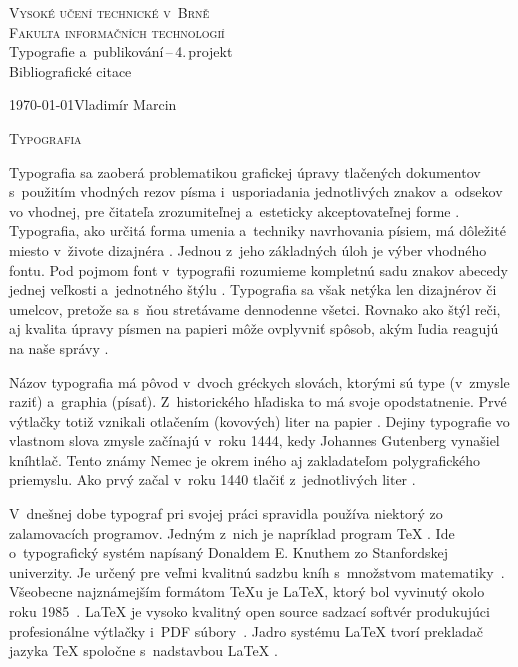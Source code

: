 \documentclass[11pt,a4paper,titlepage]{article}
\begin{document}
\begin{titlepage}
  \begin{center}
    {\Huge\textsc{Vysoké učení technické v~Brně}} \\
     \medskip
    {\huge\textsc{Fakulta informačních technologií}} \\
    {\LARGE{Typografie a~publikování\,--\,4.\,projekt}} \\
     \medskip
    {\Huge Bibliografické citace}\\
  \end{center}
{\Large\today \hfill Vladimír Marcin}
\end{titlepage}

{\Huge\textsc{Typografia}}
\medskip

Typografia sa zaoberá problematikou grafickej úpravy tlačených dokumentov s~použitím vhodných rezov písma i~usporiadania jednotlivých
znakov a~odsekov vo vhodnej, pre čitateľa zrozumiteľnej a~esteticky akceptovateľnej forme \cite{Wiki:Typografia}. Typografia, ako určitá
forma umenia a~techniky navrhovania písiem, má dôležité miesto v~živote dizajnéra \cite{Detepe:Typografia}. Jednou z~jeho základných úloh
je výber vhodného fontu. Pod pojmom font v~typografii rozumieme kompletnú sadu znakov abecedy jednej veľkosti a~jednotného štýlu \cite{Nishikimi:Fonts}.
Typografia sa však netýka len dizajnérov či umelcov, pretože sa s~ňou stretávame dennodenne všetci. Rovnako ako štýl reči, aj kvalita
úpravy písmen na papieri môže ovplyvniť spôsob, akým ľudia reagujú na naše správy \cite{Bang:Typography}.

Názov typografia má pôvod v~dvoch gréckych slovách, ktorými sú type (v~zmysle raziť) a~graphia (písať). Z~historického hľadiska to má svoje
opodstatnenie. Prvé výtlačky totiž vznikali otlačením (kovových) liter na papier \cite{Slavicek:Typografie}. Dejiny typografie vo vlastnom
slova zmysle začínajú v~roku 1444, kedy Johannes Gutenberg vynašiel kníhtlač. Tento známy Nemec je okrem iného aj zakladateľom
polygrafického priemyslu. Ako prvý začal v~roku 1440 tlačiť z~jednotlivých liter \cite{Typografie-ikt:Historia}.

V~dnešnej dobe typograf pri svojej práci spravidla používa niektorý zo zalamovacích programov. Jedným z~nich je napríklad program 
\TeX{} \cite{Wiki:Typografia}. Ide o~typografický systém napísaný Donaldem E. Knuthem zo Stanfordskej univerzity. Je určený pre veľmi
kvalitnú sadzbu kníh s~množstvom matematiky~\cite{Cerny:Znakove_sady}. Všeobecne najznámejším formátom \TeX{}u je \LaTeX{}, ktorý bol
vyvinutý okolo roku 1985~\cite{TeX:conf}. \LaTeX{} je vysoko kvalitný open source sadzací softvér produkujúci profesionálne výtlačky
i~PDF súbory~\cite{Kottwitz:Latex}. Jadro systému \LaTeX{} tvorí prekladač jazyka \TeX{} spoločne s~nadstavbou \LaTeX{} \cite{Rybicka:Latex}.

\newpage

\end{document}
